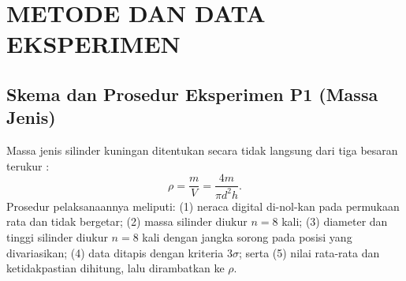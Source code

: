 \documentclass[a4paper, 12pt]{article}
\begin{document}
\section{METODE DAN DATA EKSPERIMEN}
        \subsection{Skema dan Prosedur Eksperimen P1 (Massa Jenis)}
        Massa jenis silinder kuningan ditentukan secara tidak langsung dari tiga besaran terukur \parencite{HallidayResnickWalker}:
        \begin{equation}
            \rho=\frac{m}{V}=\frac{4m}{\pi d^{2}h}.
            \label{eq:rho}
        \end{equation}
        Prosedur pelaksanaannya meliputi: (1) neraca digital di-nol-kan pada permukaan rata dan tidak bergetar; (2) massa silinder diukur $n=8$ kali; (3) diameter dan tinggi silinder diukur $n=8$ kali dengan jangka sorong pada posisi yang divariasikan; (4) data ditapis dengan kriteria $3\sigma$; serta (5) nilai rata-rata dan ketidakpastian dihitung, lalu dirambatkan ke $\rho$.
\end{document}
